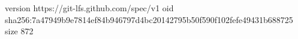 version https://git-lfs.github.com/spec/v1
oid sha256:7a47949b9e7814ef84b946797d4bc20142795b50f590f102fefe49431b688725
size 872

